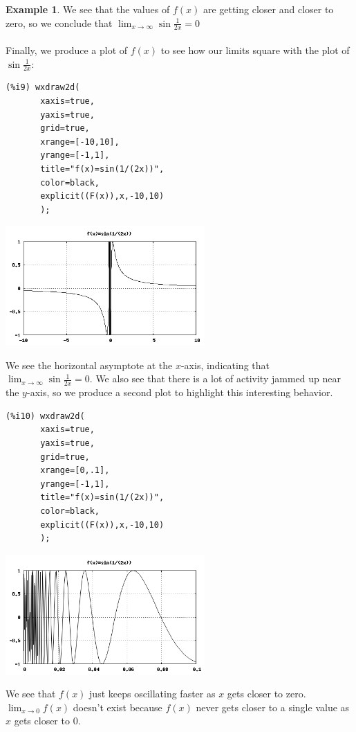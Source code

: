 \documentclass[10.5pt,twoside]{report}
\theoremstyle{definition}
\newtheorem{exmp}{Example}[section]
\begin{document}
\begin{exmp}
We see that the values of $f(x)$ are getting closer and closer to zero, so we conclude that $\lim_{x \to \infty}\sin{\frac{1}{2x}}=0$\\

${}$\\
Finally, we produce a plot of $f(x)$ to see how our limits square with the plot of $\sin{\frac{1}{2x}}$:

\begin{verbatim}
(%i9) wxdraw2d(
       xaxis=true,
       yaxis=true,
       grid=true,
       xrange=[-10,10],
       yrange=[-1,1],
       title="f(x)=sin(1/(2x))",
       color=black,
       explicit((F(x)),x,-10,10)
       );
\end{verbatim}

\includegraphics[width=3in]{example_3_1_2_1}

We see the horizontal asymptote at the $x$-axis, indicating that $\lim_{x \to \infty}\sin{\frac{1}{2x}}=0$.  We also see that there is a lot of activity jammed up near the $y$-axis, so we produce a second plot to highlight this interesting behavior.

\begin{verbatim}
(%i10) wxdraw2d(
       xaxis=true,
       yaxis=true,
       grid=true,
       xrange=[0,.1],
       yrange=[-1,1],
       title="f(x)=sin(1/(2x))",
       color=black,
       explicit((F(x)),x,-10,10)
       ); 
\end{verbatim}

\includegraphics[width=3in]{example_3_1_2_2}

We see that $f(x)$ just keeps oscillating faster as $x$ gets closer to zero.  $\lim_{x \to 0}f(x)$ doesn't exist because $f(x)$ never gets closer to a single value as $x$ gets closer to $0$.

\end{exmp}
\end{document}
